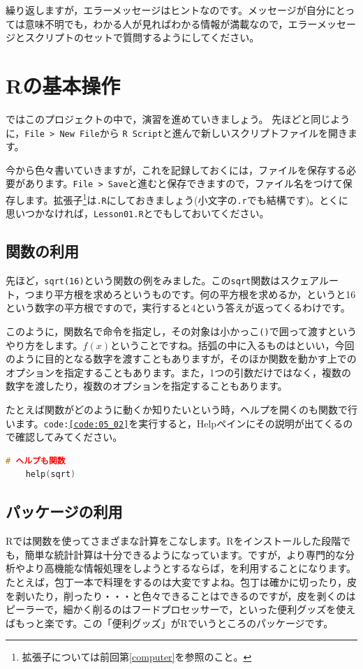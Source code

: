 \documentclass{ltjsbook}
\begin{document}
繰り返しますが，エラーメッセージはヒントなのです。メッセージが自分にとっては意味不明でも，わかる人が見ればわかる情報が満載なので，エラーメッセージとスクリプトのセットで質問するようにしてください。

\section{Rの基本操作}
ではこのプロジェクトの中で，演習を進めていきましょう。
先ほどと同じように，\verb|File > New File|から \verb|R Script|と進んで新しいスクリプトファイルを開きます。

今から色々書いていきますが，これを記録しておくには，ファイルを保存する必要があります。\verb|File > Save|と進むと保存できますので，ファイル名をつけて保存します。拡張子\footnote{拡張子については前回第\ref{computer}を参照のこと。}は\texttt{.R}にしておきましょう(小文字の\texttt{.r}でも結構です)。とくに思いつかなければ，\texttt{Lesson01.R}とでもしておいてください。

\subsection{関数の利用}
先ほど，\texttt{sqrt(16)}という関数の例をみました。この\texttt{sqrt}関数はスクェアルート，つまり平方根を求めろというものです。何の平方根を求めるか，というと16という数字の平方根ですので，実行すると4という答えが返ってくるわけです。

このように，関数名で命令を指定し，その対象は小かっこ\verb|()|で囲って渡すというやり方をします。$f(x)$ということですね。括弧の中に入るものはといい，今回のように目的となる数字を渡すこともありますが，そのほか関数を動かす上でのオプションを指定することもあります。また，1つの引数だけではなく，複数の数字を渡したり，複数のオプションを指定することもあります。

たとえば関数がどのように動くか知りたいという時，ヘルプを開くのも関数で行います。\texttt{code:\ref{code:05_02}}を実行すると，Helpペインにその説明が出てくるので確認してみてください。
\begin{lstlisting}[language=c++,label={code:05_02},caption={ヘルプのコード}]
	# ヘルプも関数
	help(sqrt)
\end{lstlisting}
\subsection{パッケージの利用}
\label{HowToUseRpackage}
Rでは関数を使ってさまざまな計算をこなします。Rをインストールした段階でも，簡単な統計計算は十分できるようになっています。ですが，より専門的な分析やより高機能な情報処理をしようとするならば，を利用することになります。たとえば，包丁一本で料理をするのは大変ですよね。包丁は確かに切ったり，皮を剥いたり，削ったり・・・と色々できることはできるのですが，皮を剥くのはピーラーで，細かく削るのはフードプロセッサーで，といった便利グッズを使えばもっと楽です。この「便利グッズ」がRでいうところのパッケージです。
\end{document}
